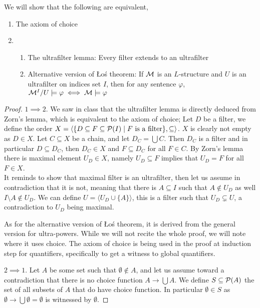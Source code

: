\question{}
We will show that the following are equivalent,
\begin{enumerate}
	\item The axiom of choice
	\item
		\begin{enumerate}
			\item The ultrafilter lemma: Every filter extends to an ultrafilter
			\item Alternative version of Łoś theorem: If $\mathcal{M}$ is an $L$-structure and $U$ is an ultrafilter on indices set $I$, then for any sentence $\varphi$, $\mathcal{M}^I / U \models \varphi \iff \mathcal{M} \models \varphi$
		\end{enumerate}
\end{enumerate}
\begin{proof}
	$1 \implies 2$.
	We saw in class that the ultrafilter lemma is directly deduced from Zorn's lemma, which is equivalent to the axiom of choice;
	Let $D$ be a filter, we define the order $X = \langle \{ D \subseteq F \subseteq \mathcal{P}(I) \mid F \text{ is a filter} \}, \subseteq \rangle$.
	$X$ is clearly not empty as $D \in X$. Let $C \subseteq X$ be a chain, and let $D_C = \bigcup C$.
	Then $D_C$ is a filter and in particular $D \subseteq D_C$, then $D_C \in X$ and $F \subseteq D_C$ for all $F \in C$.
	By Zorn's lemma there is maximal element $U_D \in X$, namely $U_D \subseteq F$ implies that $U_D = F$ for all $F \in X$. \\
	It reminds to show that maximal filter is an ultrafilter, then let us assume in contradiction that it is not, meaning that there is $A \subseteq I$ such that $A \notin U_D$ as well $I \setminus A \notin U_D$.
	We can define $U = \langle U_D \cup \{ A \} \rangle$, this is a filter such that $U_D \subsetneq U$, a contradiction to $U_D$ being maximal.

	As for the alternative version of Łoś theorem, it is derived from the general version for ultra-powers.
	While we will not recite the whole proof, we will note where it uses choice.
	The axiom of choice is being used in the proof at induction step for quantifiers, specifically to get a witness to global quantifiers.

	$2 \implies 1$.
	Let $A$ be some set such that $\emptyset \notin A$, and let us assume toward a contradiction that there is no choice function $A \to \bigcup A$.
	We define $S \subseteq \mathcal{P}(A)$ the set of all subsets of $A$ that do have choice function.
	In particular $\emptyset \in S$ as $\emptyset \to \bigcup \emptyset = \emptyset$ is witnessed by $\emptyset$.


\end{proof}
